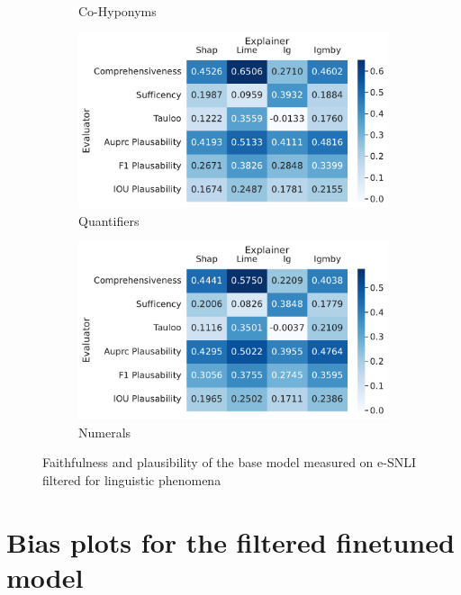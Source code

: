 \begin{figure}[t!]
\begin{subfigure}{0.49\textwidth}
        \caption{Co-Hyponyms}
    \end{subfigure}
    \begin{subfigure}{0.49\textwidth}
        \includegraphics[width=\textwidth]{./images/ferret_heatmaps_phenomena/default_mnli/quantifiers.pdf}
        \caption{Quantifiers}
    \end{subfigure}
    \begin{subfigure}{0.49\textwidth}
        \includegraphics[width=\textwidth]{./images/ferret_heatmaps_phenomena/default_mnli/numericals.pdf}
        \caption{Numerals}
    \end{subfigure}
    \caption{Faithfulness and plausibility of the base model measured on \acs{e-SNLI} filtered for linguistic phenomena}
    \label{fig:ferret-base}
\end{figure}

\section{Bias plots for the filtered finetuned model} \label{sec:bias_plots_filtered}

